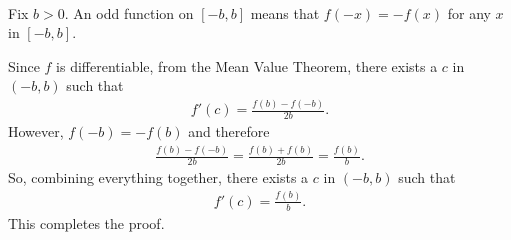 	\spc
	
	\\
	Fix $b > 0$. An odd function on $[-b, b]$ means that $f(-x) = -f(x)$ for any $x$ in $[-b, b]$.
	
	Since $f$ is differentiable, from the Mean Value Theorem, there exists a $c$ in $(-b, b)$ such that
		\begin{align*}
		f'(c) = \frac{f(b) - f(-b)}{2b} .
		\end{align*}
	However, $f(-b) = -f(b)$ and therefore
		\begin{align*}
		 \frac{f(b) - f(-b)}{2b} = \frac{f(b) + f(b)}{2b} = \frac{f(b)}{b} .
		\end{align*}
	So, combining everything together, there exists a $c$ in $(-b, b)$ such that 
		\begin{align*}
		f'(c) = \frac{f(b)}{b} .
		\end{align*}
	This completes the proof.
	
	
	
